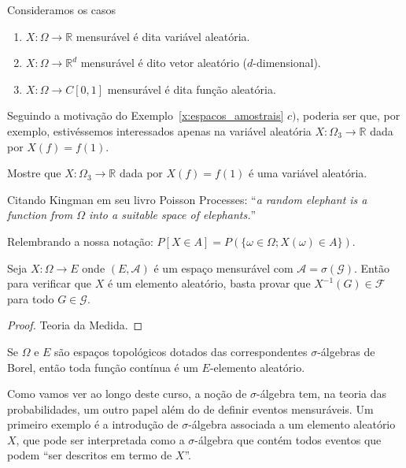 \documentclass[../main/Notas_de_aula.tex]{subfiles}
\begin{document}
\begin{example} Consideramos os casos
  \begin{enumerate}[\quad a)]
  \item $X:\Omega \to \mathbb{R}$ mensurável é dita variável aleatória. 
  \item $X:\Omega \to \mathbb{R}^d$ mensurável é dito vetor aleatório ($d$-dimensional).
  \item $X:\Omega \to C[0,1]$ mensurável é dita função aleatória.
  \end{enumerate}
\end{example}
Seguindo a motivação do Exemplo~\ref{x:espacos_amostrais} $c)$, poderia ser que, por exemplo, estivéssemos interessados apenas na variável aleatória $X:\Omega_3 \to \mathbb{R}$ dada por $X(f) = f(1)$.

\begin{exercise}
  Mostre que $X:\Omega_3 \to \mathbb{R}$ dada por $X(f) = f(1)$ é uma variável aleatória.
\end{exercise}

Citando Kingman em seu livro Poisson Processes: ``\emph{a random elephant is a function from $\Omega$ into a suitable space of elephants.}''

Relembrando a nossa notação: $P[X \in A] = P(\{\omega \in \Omega; X(\omega) \in A\})$.

\begin{proposition}
  Seja $X:\Omega \to E$ onde $(E, \mathcal{A})$ é um espaço mensurável com $\mathcal{A} = \sigma(\mathcal{G})$.
  Então para verificar que $X$ é um elemento aleatório, basta provar que $X^{-1}(G) \in \mathcal{F}$ para todo $G \in \mathcal{G}$.
\end{proposition}

\begin{proof}
  Teoria da Medida.
\end{proof}

\begin{example}
  Se $\Omega$ e $E$ são espaços topológicos dotados das correspondentes $\sigma$-álgebras de Borel, então toda função contínua é um $E$-elemento aleatório.
\end{example}

Como vamos ver ao longo deste curso, a noção de $\sigma$-álgebra tem, na teoria das probabilidades, um outro papel além do de definir eventos mensuráveis.
Um primeiro exemplo é a introdução de $\sigma$-álgebra associada a um elemento aleatório $X$, que pode ser interpretada como a $\sigma$-álgebra que contém todos eventos que podem ``ser descritos em termo de $X$''.
\end{document}
